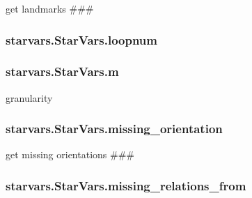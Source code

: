 get landmarks \#\#\# 

\hypertarget{classstarvars_1_1StarVars_ac65a61b0589e992831bc31185ca1cae7}{
\subsubsection[{loopnum}]{\setlength{\rightskip}{0pt plus 5cm}starvars.\-Star\-Vars.\-loopnum}}\label{classstarvars_1_1StarVars_ac65a61b0589e992831bc31185ca1cae7}
\hypertarget{classstarvars_1_1StarVars_acb182bf64bd4d1786654881f758a3285}{
\subsubsection[{m}]{\setlength{\rightskip}{0pt plus 5cm}starvars.\-Star\-Vars.\-m}}\label{classstarvars_1_1StarVars_acb182bf64bd4d1786654881f758a3285}


granularity 

\hypertarget{classstarvars_1_1StarVars_a1e0d57adb59ce8bb33bd892d96c9b2f6}{
\subsubsection[{missing\-\_\-orientation}]{\setlength{\rightskip}{0pt plus 5cm}starvars.\-Star\-Vars.\-missing\-\_\-orientation}}\label{classstarvars_1_1StarVars_a1e0d57adb59ce8bb33bd892d96c9b2f6}


get missing orientations \#\#\# 

\hypertarget{classstarvars_1_1StarVars_ad5acc05763dcb07361ad63adb12ea80c}{
\subsubsection[{missing\-\_\-relations\-\_\-from}]{\setlength{\rightskip}{0pt plus 5cm}starvars.\-Star\-Vars.\-missing\-\_\-relations\-\_\-from}}\label{classstarvars_1_1StarVars_ad5acc05763dcb07361ad63adb12ea80c}


